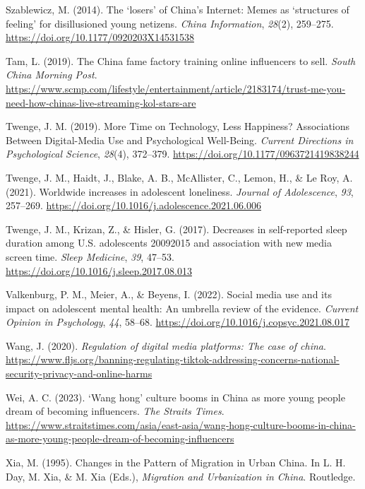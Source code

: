 \documentclass[]{interact}
\theoremstyle{plain}%
\theoremstyle{definition}
\theoremstyle{remark}
\newlength{\cslhangindent}
\newlength{\cslentryspacingunit} %
\newenvironment{CSLReferences}[2] %
 {%
  \setlength{\parindent}{0pt}
  \ifodd #1
  \let\oldpar\par
  \def\par{\hangindent=\cslhangindent\oldpar}
  \fi
  \setlength{\parskip}{#2\cslentryspacingunit}
 }%
 {}
\begin{document}
\begin{CSLReferences}{1}{0}
\leavevmode{}%
Szablewicz, M. (2014). The {`}losers{'} of China{'}s Internet: Memes as
{`}structures of feeling{'} for disillusioned young netizens.
\emph{China Information}, \emph{28}(2), 259--275.
\url{https://doi.org/10.1177/0920203X14531538}

\leavevmode{}%
Tam, L. (2019). The China fame factory training online influencers to
sell. \emph{South China Morning Post}.
\url{https://www.scmp.com/lifestyle/entertainment/article/2183174/trust-me-you-need-how-chinas-live-streaming-kol-stars-are}

\leavevmode{}%
Twenge, J. M. (2019). More Time on Technology, Less Happiness?
Associations Between Digital-Media Use and Psychological Well-Being.
\emph{Current Directions in Psychological Science}, \emph{28}(4),
372--379. \url{https://doi.org/10.1177/0963721419838244}

\leavevmode{}%
Twenge, J. M., Haidt, J., Blake, A. B., McAllister, C., Lemon, H., \& Le
Roy, A. (2021). Worldwide increases in adolescent loneliness.
\emph{Journal of Adolescence}, \emph{93}, 257--269.
\url{https://doi.org/10.1016/j.adolescence.2021.06.006}

\leavevmode{}%
Twenge, J. M., Krizan, Z., \& Hisler, G. (2017). Decreases in
self-reported sleep duration among U.S. adolescents
2009{\textendash}2015 and association with new media screen time.
\emph{Sleep Medicine}, \emph{39}, 47--53.
\url{https://doi.org/10.1016/j.sleep.2017.08.013}

\leavevmode{}%
Valkenburg, P. M., Meier, A., \& Beyens, I. (2022). Social media use and
its impact on adolescent mental health: An umbrella review of the
evidence. \emph{Current Opinion in Psychology}, \emph{44}, 58--68.
\url{https://doi.org/10.1016/j.copsyc.2021.08.017}

\leavevmode{}%
Wang, J. (2020). \emph{Regulation of digital media platforms: The case
of china}.
\url{https://www.fljs.org/banning-regulating-tiktok-addressing-concerns-national-security-privacy-and-online-harms}

\leavevmode{}%
Wei, A. C. (2023). {`}Wang hong{'} culture booms in China as more young
people dream of becoming influencers. \emph{The Straits Times}.
\url{https://www.straitstimes.com/asia/east-asia/wang-hong-culture-booms-in-china-as-more-young-people-dream-of-becoming-influencers}

\leavevmode{}%
Xia, M. (1995). Changes in the {Pattern} of {Migration} in {Urban}
{China}. In L. H. Day, M. Xia, \& M. Xia (Eds.), \emph{Migration and
{Urbanization} in {China}}. Routledge.

\end{CSLReferences}
\end{document}
